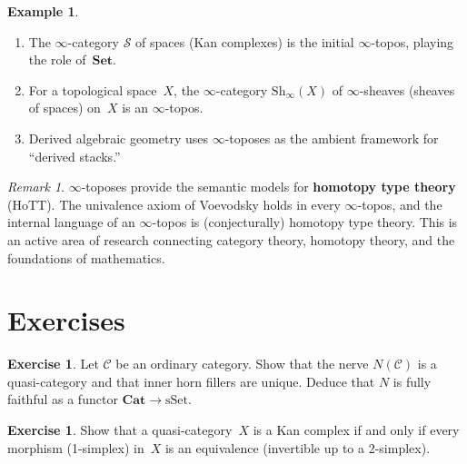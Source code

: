\documentclass[a4paper,12pt]{book}
\newcommand{\Set}{\mathbf{Set}}
\newcommand{\Cat}{\mathbf{Cat}}
\theoremstyle{definition}
\newtheorem{example}[definition]{Example}
\newtheorem{exercise}[definition]{Exercise}
\theoremstyle{plain}
\theoremstyle{remark}
\newtheorem{remark}[definition]{Remark}
\begin{document}
\begin{example}\label{ex:infty-toposes}
\begin{enumerate}[label=(\roman*)]
\item The $\infty$-category $\mathcal{S}$ of spaces (Kan complexes) is
      the initial $\infty$-topos, playing the role of~$\Set$.
\item For a topological space~$X$, the $\infty$-category
      $\mathrm{Sh}_\infty(X)$ of $\infty$-sheaves (sheaves of spaces)
      on~$X$ is an $\infty$-topos.
\item Derived algebraic geometry uses $\infty$-toposes as the ambient
      framework for ``derived stacks.''
\end{enumerate}
\end{example}

\begin{remark}\label{rem:hott}
$\infty$-toposes provide the semantic models for \textbf{homotopy type
theory} (HoTT).  The univalence axiom of Voevodsky holds in every
$\infty$-topos, and the internal language of an $\infty$-topos is
(conjecturally) homotopy type theory.  This is an active area of research
connecting category theory, homotopy theory, and the foundations of
mathematics.
\end{remark}



\section{Exercises}\label{sec:infty-exercises}

\begin{exercise}\label{ex:nerve-quasi}
Let $\mathcal{C}$ be an ordinary category.  Show that the nerve
$N(\mathcal{C})$ is a quasi-category and that inner horn fillers
are unique.  Deduce that $N$ is fully faithful as a functor
$\Cat\to\mathrm{sSet}$.
\end{exercise}

\begin{exercise}\label{ex:kan-groupoid}
Show that a quasi-category~$X$ is a Kan complex if and only if every
morphism (1-simplex) in~$X$ is an equivalence (invertible up to a
2-simplex).
\end{exercise}
\end{document}
